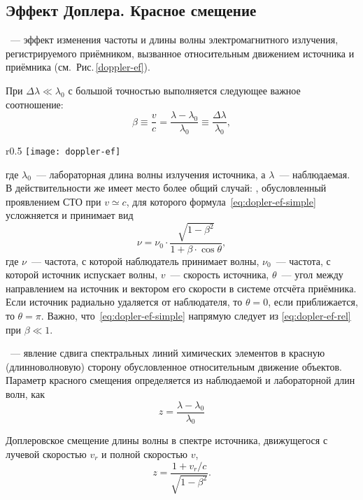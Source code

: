 \subsection{Эффект Доплера. Красное смещение} 
~--- эффект изменения частоты и длины волны электромагнитного излучения, регистрируемого приёмником, вызванное относительным движением источника и приёмника (см.~Рис.\,\ref{doppler-ef}).

При $\Delta \lambda \ll \lambda_0$ с большой точностью выполняется следующее важное соотношение:\begin{equation}
	\beta \equiv \dfrac{v}{c} = \dfrac{\lambda - \lambda_0}{\lambda_0} \equiv \dfrac{\Delta \lambda}{\lambda_0},
	\label{eq:dopler-ef-simple}
\end{equation}
\begin{wrapfigure}[6]{r}{0.5\tw}
	\centering
	\vspace{-.5pc}
	\texttt{[image: doppler-ef]}
	\caption{Эффект Доплера}
	\label{doppler-ef}
\end{wrapfigure}
где $\lambda_0$~--- лабораторная длина волны излучения источника, а $\lambda$~--- наблюдаемая. В действительности же имеет место более общий случай: , обусловленный проявлением СТО при $v \simeq c$, для которого формула~\eqref{eq:dopler-ef-simple} усложняется и принимает вид 
\begin{equation}
	\nu = \nu_0 \cdot \dfrac{\sqrt{1 - \beta^2}}{1 + \beta \cdot \cos\theta},
	\label{eq:dopler-ef-rel}
\end{equation}
где $\nu$~--- частота, с которой наблюдатель принимает волны, $\nu_0$~--- частота, с которой источник испускает волны, $v$~--- скорость источника, $\theta$~--- угол между направлением на источник и вектором его скорости в системе отсчёта приёмника. Если источник радиально удаляется от наблюдателя, то $\theta = 0$, если приближается, то $\theta =\pi$. Важно, что~\eqref{eq:dopler-ef-simple} напрямую следует из \eqref{eq:dopler-ef-rel} при $\beta  \ll 1$.

~--- явление сдвига спектральных линий химических элементов в красную (длинноволновую) сторону обусловленное относительным движение объектов. Параметр красного смещения определяется из наблюдаемой и лабораторной длин волн, как
\begin{equation}
	z = \dfrac{\lambda - \lambda_0}{\lambda_0}
\end{equation}

Доплеровское смещение длины волны в спектре источника, движущегося с лучевой скоростью $v_{r}$ и полной скоростью $v$,
\begin{equation}
z = \dfrac{1 + v_r / c}{\sqrt{1 - \beta^2}}.
\end{equation}

